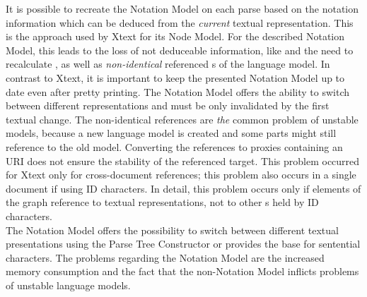 It is possible to recreate the Notation Model on each parse based on the notation information which can be deduced from the \emph{current} textual representation. This is the approach used by Xtext for its Node Model. For the described Notation Model, this leads to the loss of not deduceable information, like  and the need to recalculate , as well as \emph{non-identical} referenced s of the language model. In contrast to Xtext, it is important to keep the presented Notation Model up to date even after pretty printing. The Notation Model offers the ability to switch between different representations and must be only invalidated by the first textual change. The non-identical references are \emph{the} common problem of unstable models, because a new language model is created and some parts might still reference to the old model. Converting the references to proxies containing an URI does not ensure the stability of the referenced target. This problem occurred for Xtext only for cross-document references; this problem also occurs in a single document if using ID characters. In detail, this problem occurs only if elements of the  graph reference to textual representations, not to other s held by ID characters.\\
The Notation Model offers the possibility to switch between different textual presentations using the Parse Tree Constructor or provides the base for sentential characters. The problems regarding the Notation Model are the increased memory consumption and the fact that the non-Notation Model inflicts problems of unstable language models. 

